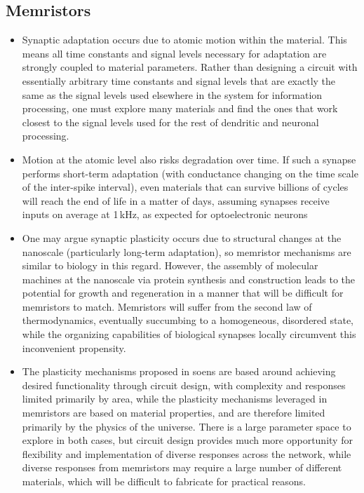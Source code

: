 \documentclass[twocolumn]{article}
\begin{document}
\subsection{Memristors}

\begin{itemize}

\item Synaptic adaptation occurs due to atomic motion within the material. This means all time constants and signal levels necessary for adaptation are strongly coupled to material parameters. Rather than designing a circuit with essentially arbitrary time constants and signal levels that are exactly the same as the signal levels used elsewhere in the system for information processing, one must explore many materials and find the ones that work closest to the signal levels used for the rest of dendritic and neuronal processing.

\item Motion at the atomic level also risks degradation over time. If such a synapse performs short-term adaptation (with conductance changing on the time scale of the inter-spike interval), even materials that can survive billions of cycles will reach the end of life in a matter of days, assuming synapses receive inputs on average at 1\,kHz, as expected for optoelectronic neurons

\item One may argue synaptic plasticity occurs due to structural changes at the nanoscale (particularly long-term adaptation), so memristor mechanisms are similar to biology in this regard. However, the assembly of molecular machines at the nanoscale via protein synthesis and construction leads to the potential for growth and regeneration in a manner that will be difficult for memristors to match. Memristors will suffer from the second law of thermodynamics, eventually succumbing to a homogeneous, disordered state, while the organizing capabilities of biological synapses locally circumvent this inconvenient propensity.

\item The plasticity mechanisms proposed in soens are based around achieving desired functionality through circuit design, with complexity and responses limited primarily by area, while the plasticity mechanisms leveraged in memristors are based on material properties, and are therefore limited primarily by the physics of the universe. There is a large parameter space to explore in both cases, but circuit design provides much more opportunity for flexibility and implementation of diverse responses across the network, while diverse responses from memristors may require a large number of different materials, which will be difficult to fabricate for practical reasons.


\end{itemize}
\end{document}
